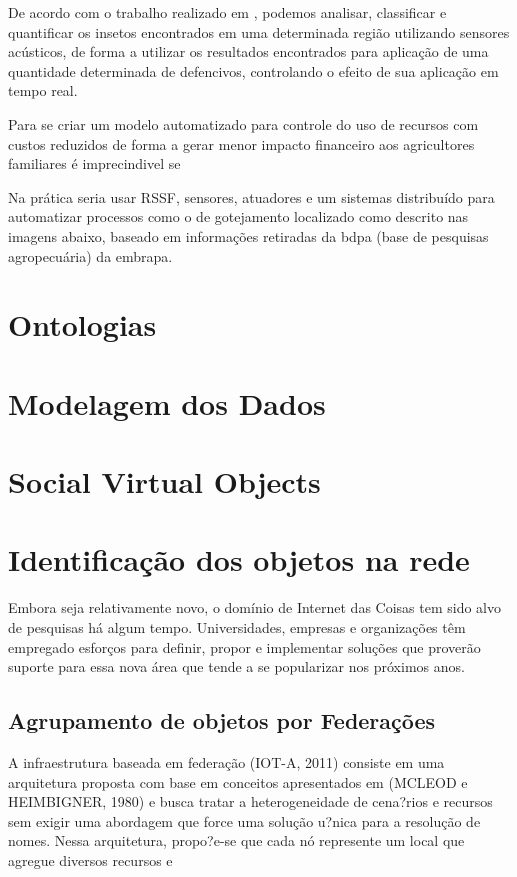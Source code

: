 De acordo com o trabalho realizado em \cite{Chen2014}, podemos analisar, classificar e quantificar os insetos encontrados em uma determinada região utilizando sensores acústicos, de forma a utilizar os resultados encontrados para aplicação de uma quantidade determinada de defencivos, controlando o efeito de sua aplicação em tempo real.

Para se criar um modelo automatizado para controle do uso de recursos com custos reduzidos de forma a gerar menor impacto financeiro aos agricultores familiares é imprecindivel se  

Na prática seria usar RSSF, sensores, atuadores e um sistemas distribuído para automatizar processos como o de gotejamento localizado como descrito nas imagens abaixo, baseado em informações retiradas da bdpa (base de pesquisas agropecuária) da embrapa.


\section{Ontologias}

\section{Modelagem dos Dados}

\section{Social Virtual Objects}

\section{Identifica\c{c}\~{a}o dos objetos na rede}
	Embora seja relativamente novo, o dom\'{i}nio de Internet das Coisas tem sido alvo de pesquisas h\'{a} algum tempo. Universidades, empresas e organiza\c{c}\~{o}es t\^{e}m empregado esfor\c{c}os para definir, propor e implementar solu\c{c}\~{o}es que prover\~{a}o suporte para essa nova \'{a}rea que tende a se popularizar nos pr\'{o}ximos anos.	
	
\subsection{Agrupamento de objetos por Federa\c{c}\~{o}es}
	 A infraestrutura baseada em federa\c{c}\~{a}o (IOT-A, 2011) consiste em uma arquitetura proposta com base em conceitos apresentados em (MCLEOD e HEIMBIGNER, 1980) e busca tratar a heterogeneidade de cena?rios e recursos sem exigir uma abordagem que force uma solu\c{c}\~{a}o u?nica para a resolu\c{c}\~{a}o de nomes. Nessa arquitetura, propo?e-se que cada n\'{o} represente um local que agregue diversos recursos e	

